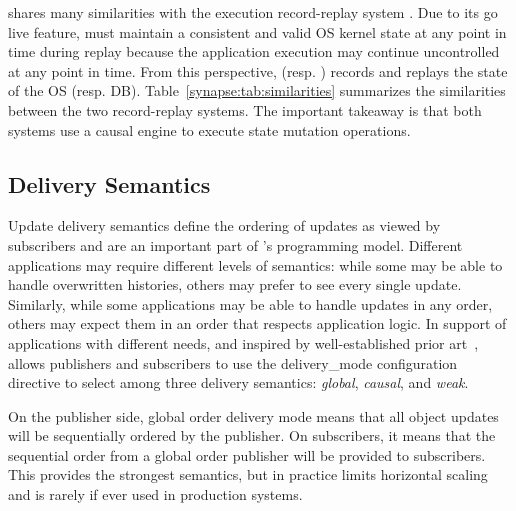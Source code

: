 \synapse shares many similarities with the execution record-replay system \scribe.
Due to its go live feature, \scribe must maintain a consistent and valid OS
kernel state at any point in time during replay because the application
execution may continue uncontrolled at any point in time.
From this perspective, \scribe (resp. \synapse) records and replays the state of
the OS (resp. DB).
Table~\ref{synapse:tab:similarities} summarizes the similarities between the
two record-replay systems. The important takeaway is that both systems use a
causal engine to execute state mutation operations.

\subsection{\synapse Delivery Semantics}
\label{synapse:sec:semantics}
Update delivery semantics define the ordering of updates as viewed by subscribers and are an important part of \synapse's
programming model. Different applications may 
require different levels of semantics:  while some may be able to handle overwritten histories,
others may prefer to see every single update.  Similarly, while some
applications may be able to  handle updates in any order, others may expect them in an
order that respects application logic. In support of applications with
different needs, and inspired by well-established prior
art~\cite{Birman:1991:LCA:128738.128742}, \synapse allows
publishers and subscribers to use the {\code delivery\_mode} configuration directive
to select among three delivery semantics: {\em global}, {\em causal},
and {\em weak}. 

On the publisher side, global order delivery mode means that all object
updates will be sequentially ordered by the publisher.  On
subscribers, it means that the sequential order from a global order
publisher will be provided to subscribers.  This provides the
strongest semantics, but in practice limits horizontal scaling and is
rarely if ever used in production systems.  

